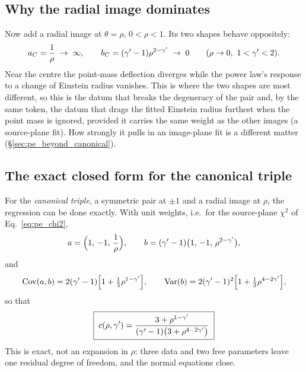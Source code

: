 \subsection{Why the radial image dominates}

Now add a radial image at $\theta=\rho$, $0<\rho<1$. Its two shapes
behave oppositely:
\[
    a_C=\frac{1}{\rho}\;\to\;\infty,
    \qquad
    b_C=(\gamma'-1)\rho^{2-\gamma'}\;\to\;0
    \qquad(\rho\to0,\ 1<\gamma'<2).
\]
Near the centre the point-mass deflection diverges while the power
law's response to a change of Einstein radius vanishes. This is where
the two shapes are most different, so this is the datum that
breaks the degeneracy of the pair and, by the same token, the datum
that drags the fitted Einstein radius furthest when the point mass is
ignored, provided it carries the same weight as the other images (a
source-plane fit). How strongly it pulls in an image-plane fit is a
different matter (\S\ref{sec:pe_beyond_canonical}).

\subsection{The exact closed form for the canonical triple}
\label{sec:pe_closed_form}

For the \emph{canonical triple}, a symmetric pair at $\pm1$ and a
radial image at $\rho$, the regression can be done exactly. With unit
weights, i.e.\ for the source-plane $\chi^2$ of Eq.~\eqref{eq:pe_chi2},
\begin{equation}
    a=\Bigl(1,\,-1,\,\frac1\rho\Bigr),
    \qquad
    b=(\gamma'-1)\bigl(1,\,-1,\,\rho^{2-\gamma'}\bigr),
    \label{eq:pe_triple}
\end{equation}
and
\begin{equation}
    \operatorname{Cov}(a,b)=2(\gamma'-1)\Bigl[1+\tfrac13\rho^{1-\gamma'}\Bigr],
    \qquad
    \operatorname{Var}(b)=2(\gamma'-1)^2\Bigl[1+\tfrac13\rho^{4-2\gamma'}\Bigr],
    \label{eq:pe_covvar}
\end{equation}
so that
\begin{equation}
    \boxed{\;
    c(\rho,\gamma')=\frac{3+\rho^{1-\gamma'}}{(\gamma'-1)\bigl(3+\rho^{4-2\gamma'}\bigr)}\;}
    \label{eq:pe_cclosed}
\end{equation}
This is exact, not an expansion in $\rho$: three data and two free
parameters leave one residual degree of freedom, and the normal
equations close.


